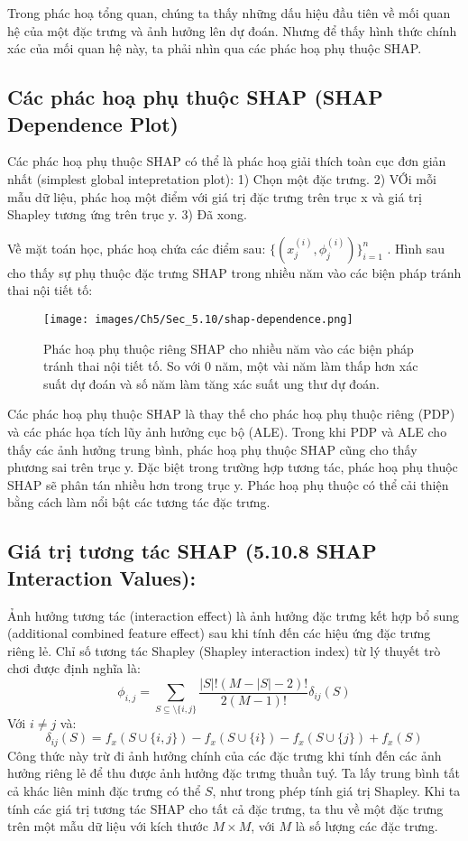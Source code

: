 \begin{enumerate}
Trong phác hoạ tổng quan, chúng ta thấy những dấu hiệu đầu tiên về mối quan hệ của một đặc trưng và ảnh hưởng lên dự đoán. Nhưng để thấy hình thức chính xác của mối quan hệ này, ta phải nhìn qua các phác hoạ phụ thuộc SHAP.

\subsection{Các phác hoạ phụ thuộc SHAP (SHAP Dependence Plot)}

Các phác hoạ phụ thuộc SHAP có thể là phác hoạ giải thích toàn cục đơn giản nhất (simplest global intepretation plot): 1) Chọn một đặc trưng. 2) VỚi mỗi mẫu dữ liệu, phác hoạ một điểm với giá trị đặc trưng trên trục x và giá trị Shapley tương ứng trên trục y. 3) Đã xong. 

Về mặt toán học, phác hoạ chứa các điểm sau:  $ \{(x_j^{(i)},\phi_j^{(i)})\}_{i=1}^n$
. Hình sau cho thấy sự phụ thuộc đặc trưng SHAP trong nhiều năm vào các biện pháp tránh thai nội tiết tố:

\begin{figure*}[h!]
	\centering
	\texttt{[image: images/Ch5/Sec\_5.10/shap-dependence.png]}
	\label{fig:5_53}
	\caption{Phác hoạ phụ thuộc riêng SHAP cho nhiều năm vào các biện pháp tránh thai nội tiết tố. So với $0$ năm, một vài năm làm thấp hơn xác suất dự đoán và số năm làm tăng xác suất ung thư dự đoán. }
\end{figure*}

Các phác hoạ phụ thuộc SHAP là thay thế cho phác hoạ phụ thuộc riêng (PDP) và các phác họa tích lũy ảnh hưởng cục bộ (ALE). Trong khi PDP và ALE cho thấy các ảnh hưởng trung bình, phác hoạ phụ thuộc SHAP cũng cho thấy phương sai trên trục y. Đặc biệt trong trường hợp tương tác, phác hoạ phụ thuộc SHAP sẽ phân tán nhiều hơn trong trục y. Phác hoạ phụ thuộc có thể cải thiện bằng cách làm nổi bật các tương tác đặc trưng. 

\subsection{Giá trị tương tác SHAP (5.10.8 SHAP Interaction Values):}

Ảnh hưởng tương tác (interaction effect) là ảnh hưởng đặc trưng kết hợp bổ sung (additional combined feature effect) sau khi tính đến các hiệu ứng đặc trưng riêng lẻ. Chỉ số tương tác Shapley (Shapley interaction index) từ lý thuyết trò chơi được định nghĩa là: 
$$\phi_{i,j}=\sum_{S\subseteq\setminus\{i,j\}}\frac{|S|!(M-|S|-2)!}{2(M-1)!}\delta_{ij}(S)$$
Với $i \neq j$ và: 
$$\delta_{ij}(S)=f_x(S\cup\{i,j\})-f_x(S\cup\{i\})-f_x(S\cup\{j\})+f_x(S)
$$
Công thức này trừ đi ảnh hưởng chính của các đặc trưng khi tính đến các ảnh hưởng riêng lẻ để thu được ảnh hưởng đặc trưng thuần tuý. Ta lấy trung bình tất cả khác liên minh đặc trưng có thể $S$, như trong phép tính giá trị Shapley. Khi ta tính các giá trị tương tác SHAP cho tất cả đặc trưng, ta thu về một đặc trưng trên một mẫu dữ liệu với kích thước $M \times M$, với $M$ là số lượng các đặc trưng.


\end{enumerate}
